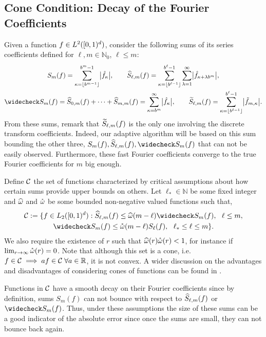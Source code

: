 \documentclass[graybox]{svmult}
\newcommand{\R}{\mathbb{R}} %
\newcommand{\N}{\mathbb{N}} %
\begin{document}
\subsection{Cone Condition: Decay of the Fourier Coefficients}\label{sumscoeff}
Given a function $f\in L^2([0,1)^d)$, consider the following sums of its series coefficients defined for $\ell,m \in \N_0$, $\ell \le m$:
\begin{gather*}
S_m(f) =  \sum_{\kappa=\left \lfloor b^{m-1} \right \rfloor}^{b^{m}-1} \bigabs{\hf_{\kappa}}, \qquad 
\hS_{\ell,m}(f)  = \sum_{\kappa=\left \lfloor b^{\ell-1} \right \rfloor}^{b^{\ell}-1} \sum_{\lambda=1}^{\infty} \bigabs{ \hf_{\kappa+\lambda b^{m}}}, \\
\wcS_m(f)=\hS_{0,m}(f) + \cdots + \hS_{m,m}(f)=
\sum_{\kappa=b^{m}}^{\infty} \bigabs{\hf_{\kappa}}, \qquad
\tS_{\ell,m}(f) = \sum_{\kappa=\left \lfloor b^{\ell-1}\right \rfloor}^{b^{\ell}-1} \bigabs{\tf_{m,\kappa}}.
\end{gather*}
From these sums, remark that $\widetilde{S}_{\ell,m}(f)$ is the only one involving the discrete transform coefficients. Indeed, our adaptive algorithm will be based on this sum bounding the other three, $S_m(f),\hS_{\ell,m}(f),\wcS_m(f)$ that can not be easily observed. Furthermore, these fast Fourier coefficients converge to the true Fourier coefficients for $m$ big enough.

Define $\mathcal{C}$ the set of functions characterized by critical assumptions about how certain sums provide upper bounds on others.  Let $\ell_* \in \N$ be some fixed integer and $\widehat{\omega}$ and $\mathring{\omega}$ be some bounded non-negative valued functions such that,
\begin{multline} \label{conecond}
\cc:=\{f \in \Lebesgue_2(\cube) : \hS_{\ell,m}(f) \le \homega(m-\ell) \wcS_m(f),\ \ \ell \le m, \\
\wcS_m(f) \le \wcomega(m-\ell) S_{\ell}(f),\ \  \ell_* \le \ell \le m\}.
\end{multline}
We also require the existence of $r$ such that $\widehat{\omega}(r) \mathring{\omega}(r)<1$, for instance if $\lim_{r\rightarrow\infty}\mathring{\omega}(r)=0$. Note that although this set is a cone, i.e. $f \in \cc \implies af \in \cc\;\forall a\in\R$, it is not convex. A wider discussion on the advantages and disadvantages of considering cones of functions can be found in \cite{Clancy201421}.

Functions in $\mathcal{C}$ have a smooth decay on their Fourier coefficients since by definition, sums $S_m(f)$ can not bounce with respect to $\widehat{S}_{\ell,m}(f)$ or $\wcS_m(f)$. Thus, under these assumptions the size of these sums can be a good indicator of the absolute error since once the sums are small, they can not bounce back again.
\end{document}
